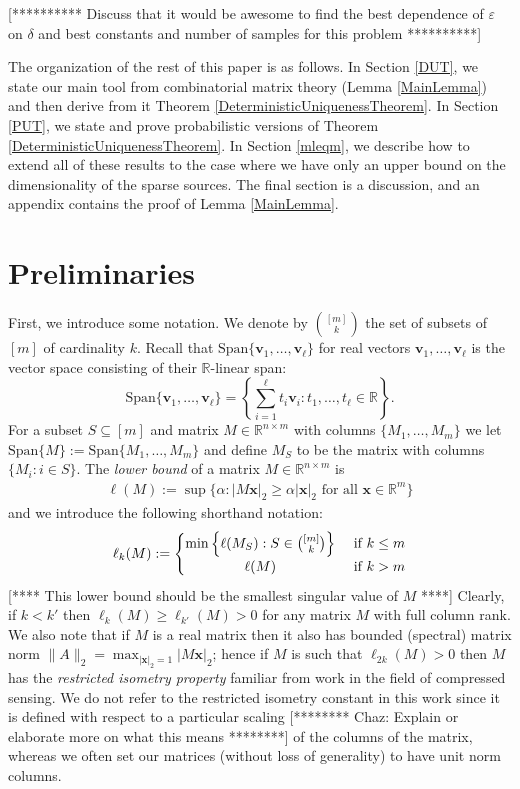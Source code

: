 \documentclass[journal, onecolumn]{IEEEtran}
\begin{document}
[********** Discuss that it would be awesome to find the best dependence of $\varepsilon$ on $\delta$ and best constants and number of samples for this problem **********]

The organization of the rest of this paper is as follows. In Section \ref{DUT}, we state our main tool from combinatorial matrix theory (Lemma \ref{MainLemma}) and then derive from it Theorem \ref{DeterministicUniquenessTheorem}. In Section \ref{PUT}, we state and prove probabilistic versions of Theorem \ref{DeterministicUniquenessTheorem}. In Section \ref{mleqm}, we describe how to extend all of these results to the case where we have only an upper bound on the dimensionality of the sparse sources. The final section is a discussion, and an appendix contains the proof of Lemma \ref{MainLemma}.


\section{Preliminaries}
 First, we introduce some notation. We denote by ${[m] \choose k}$ the set of subsets of $[m]$ of cardinality $k$. Recall that $\text{Span}\{\mathbf{v}_1, \ldots, \mathbf{v}_\ell\}$ for real vectors $\mathbf{v}_1, \ldots, \mathbf{v}_\ell$ is the vector space consisting of their $\mathbb{R}$-linear span:
%
\[ \text{Span}\{\mathbf{v}_1, \ldots, \mathbf{v}_\ell\} = \left\{ \sum_{i=1}^\ell t_i\mathbf{v}_i : t_1, \ldots, t_\ell \in \mathbb{R}\right\}. \]
%
For a subset $S \subseteq [m]$ and matrix $M \in \mathbb{R}^{n \times m}$ with columns $\{M_1,\ldots,M_m\}$ we let $\text{Span}\{M\} := \text{Span}\{M_1, \ldots, M_m\}$ and define $M_S$ to be the matrix with columns $\{M_i: i \in S\}$. The \emph{lower bound} of a matrix $M \in \mathbb{R}^{n \times m}$ \cite{REF} is 
\begin{align*}
\ell(M) := \sup \{ \alpha : |M\mathbf{x}|_2 \geq \alpha|\mathbf{x}|_2 \text{ for all } \mathbf{x} \in \mathbb{R}^m\}
\end{align*}
%
and we introduce the following shorthand notation:
\[
 \ell_k(M) :=
  \begin{cases} 
      \hfill \min \left\{ \ell(M_S) : S \in {[m] \choose k} \right\} \hfill & \text{ if $k \leq m$} \\
      \hfill \ell(M) \hfill & \text{ if $k > m$} \\
  \end{cases}
\]
[**** This lower bound should be the smallest singular value of $M$ ****]
Clearly, if $k < k'$ then $\ell_{k}(M) \geq \ell_{k'}(M) > 0$ for any matrix $M$ with full column rank. We also note that if $M$ is a real matrix then it also has bounded (spectral) matrix norm $\|A\|_2 = \max_{|\mathbf{x}|_2 = 1}|M\mathbf{x}|_2$; hence if $M$ is such that $\ell_{2k}(M) > 0$ then $M$ has the \emph{restricted isometry property} \cite{CandesTao05} familiar from work in the field of compressed sensing. We do not refer to the restricted isometry constant in this work since it is defined with respect to a particular scaling [******** Chaz:  Explain or elaborate more on what this means ********] of the columns of the matrix, whereas we often set our matrices (without loss of generality) to have unit norm columns.
\end{document}
